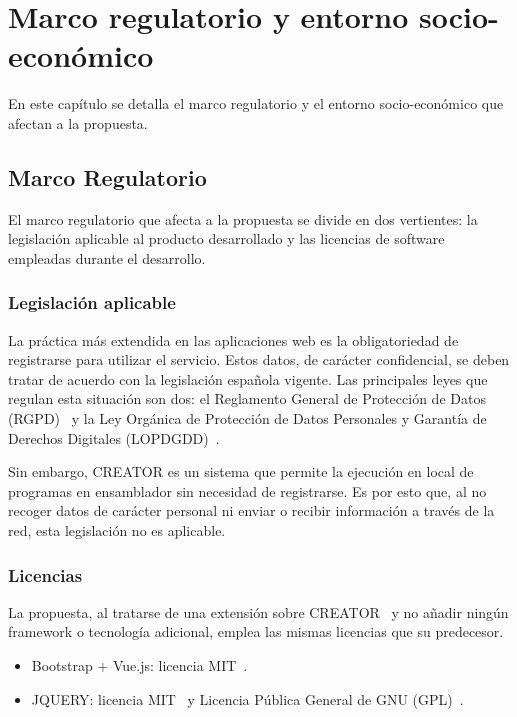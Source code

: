 \chapter{Marco regulatorio y entorno socio-económico}\label{chap:regulation}
En este capítulo se detalla el marco regulatorio y el entorno socio-económico que afectan a la propuesta.

\section{Marco Regulatorio}\label{sec:regulatory-framework}
El marco regulatorio que afecta a la propuesta se divide en dos vertientes: la legislación aplicable al producto desarrollado y las licencias de software empleadas durante el desarrollo.

\subsection{Legislación aplicable}
La práctica más extendida en las aplicaciones web es la obligatoriedad de registrarse para utilizar el servicio. Estos datos, de carácter confidencial, se deben tratar de acuerdo con la legislación española vigente. Las principales leyes que regulan esta situación son dos: el Reglamento General de Protección de Datos (RGPD)~\cite{rgpd} y la Ley Orgánica de Protección de Datos Personales y Garantía de Derechos Digitales (LOPDGDD)~\cite{ley-de-datos}.

Sin embargo, CREATOR es un sistema que permite la ejecución en local de programas en ensamblador sin necesidad de registrarse. Es por esto que, al no recoger datos de carácter personal ni enviar o recibir información a través de la red, esta legislación no es aplicable.

\subsection{Licencias}
La propuesta, al tratarse de una extensión sobre CREATOR~\cite{camarmas2024creator} y no añadir ningún framework o tecnología adicional, emplea las mismas licencias que su predecesor.

\begin{itemize}
    \item Bootstrap + Vue.js: licencia MIT~\cite{MIT-license}.
    \item JQUERY: licencia MIT~\cite{MIT-license} y Licencia Pública General de GNU (GPL)~\cite{gnu-license}.
\end{itemize}

